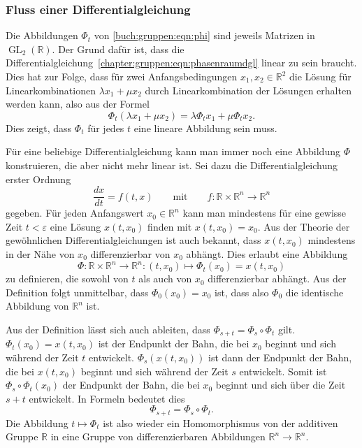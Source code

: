 \subsubsection{Fluss einer Differentialgleichung}
%
Die Abbildungen $\Phi_t$ von \eqref{buch:gruppen:eqn:phi} sind jeweils
Matrizen in $\operatorname{GL}_2(\mathbb{R})$.
Der Grund dafür ist, dass die
Differentialgleichung~\eqref{chapter:gruppen:eqn:phasenraumdgl}
linear zu sein braucht.
Dies hat zur Folge, dass für zwei Anfangsbedingungen $x_1,x_2\in\mathbb{R}^2$
die Lösung für Linearkombinationen $\lambda x_1+\mu x_2$ durch
Linearkombination der Lösungen erhalten werden kann, also
aus der Formel
\[
\Phi_t (\lambda x_1 + \mu x_2) = \lambda \Phi_t x_1 + \mu \Phi_t x_2.
\]
Dies zeigt, dass $\Phi_t$ für jedes $t$ eine lineare Abbildung sein muss.

Für eine beliebige Differentialgleichung kann man immer noch eine Abbildung
$\Phi$ konstruieren, die aber nicht mehr linear ist.
Sei dazu die Differentialgleichung erster Ordnung
\begin{equation}
\frac{dx}{dt}
=
f(t,x)
\qquad\text{mit}\qquad
f\colon \mathbb{R}\times\mathbb{R}^n \to \mathbb{R}^n
\label{buch:gruppen:eqn:dgl}
\end{equation}
gegeben.
Für jeden Anfangswert $x_0\in\mathbb{R}^n$ kann man mindestens für eine
gewisse Zeit $t <\varepsilon$ eine Lösung $x(t,x_0)$ finden mit $x(t,x_0)=x_0$.
Aus der Theorie der gewöhnlichen Differentialgleichungen ist auch
bekannt, dass $x(t,x_0)$ mindestens in der Nähe von $x_0$ differenzierbar von
$x_0$ abhängt.
Dies erlaubt eine Abbildung
\[
\Phi\colon \mathbb{R}\times \mathbb{R}^n \to \mathbb{R}^n
:
(t,x_0) \mapsto \Phi_t(x_0) = x(t,x_0)
\]
zu definieren, die sowohl von $t$ als auch von $x_0$ differenzierbar
abhängt.
Aus der Definition folgt unmittelbar, dass $\Phi_0(x_0)=x_0$ ist, dass
also $\Phi_0$ die identische Abbildung von $\mathbb{R}^n$ ist.

Aus der Definition lässt sich auch ableiten, dass
$\Phi_{s+t}=\Phi_s\circ\Phi_t$ gilt.
$\Phi_t(x_0)=x(t,x_0)$ ist der Endpunkt der Bahn, die bei $x_0$ beginnt
und sich während der Zeit $t$ entwickelt.
$\Phi_s(x(t,x_0))$ ist dann der Endpunkt der Bahn, die bei $x(t,x_0)$ 
beginnt und sich während der Zeit $s$ entwickelt.
Somit ist $\Phi_s\circ \Phi_t(x_0)$ der Endpunkt der Bahn, die bei
$x_0$ beginnt und sich über die Zeit $s+t$ entwickelt.
In Formeln bedeutet dies
\[
\Phi_{s+t} = \Phi_s\circ \Phi_t.
\]
Die Abbildung $t\mapsto \Phi_t$ ist also wieder ein Homomorphismus
von der additiven Gruppe $\mathbb{R}$ in eine Gruppe von differenzierbaren
Abbildungen $\mathbb{R}^n\to\mathbb{R}^n$.

